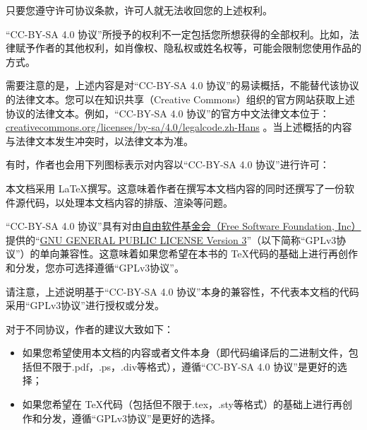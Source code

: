 只要您遵守许可协议条款，许可人就无法收回您的上述权利。

“CC-BY-SA 4.0 协议”所授予的权利不一定包括您所想获得的全部权利。比如，法律赋予作者的其他权利，如肖像权、隐私权或姓名权等，可能会限制您使用作品的方式。

需要注意的是，上述内容是对“CC-BY-SA 4.0 协议”的易读概括，不能替代该协议的法律文本。您可以在知识共享（Creative Commons）组织的官方网站获取上述协议的法律文本。例如，“CC-BY-SA 4.0 协议”的官方中文法律文本位于：\href{https://creativecommons.org/licenses/by-sa/4.0/legalcode.zh-Hans}{creativecommons.org/licenses/by-sa/4.0/legalcode.zh-Hans} 。当上述概括的内容与法律文本发生冲突时，以法律文本为准。

有时，作者也会用下列图标表示对内容以“CC-BY-SA 4.0 协议”进行许可：


本文档采用 \LaTeX 撰写。这意味着作者在撰写本文档内容的同时还撰写了一份软件源代码，以处理本文档内容的排版、渲染等问题。

“CC-BY-SA 4.0 协议”具有对由\href{https://www.fsf.org/}{自由软件基金会（Free Software Foundation, Inc）}提供的“\href{https://www.gnu.org/licenses/gpl-3.0.html}{GNU GENERAL PUBLIC LICENSE Version 3}”（以下简称“GPLv3协议”）的单向兼容性。这意味着如果您希望在本书的 \TeX 代码的基础上进行再创作和分发，您亦可选择遵循“GPLv3协议”。 


请注意，上述说明基于“CC-BY-SA 4.0 协议”本身的兼容性，不代表本文档的代码采用“GPLv3协议”进行授权或分发。

对于不同协议，作者的建议大致如下：

\begin{itemize}
    \item 如果您希望使用本文档的内容或者文件本身（即代码编译后的二进制文件，包括但不限于.pdf，.ps，.div等格式），遵循“CC-BY-SA 4.0 协议”是更好的选择；
    
    \item 如果您希望在 \TeX 代码（包括但不限于.tex，.sty等格式）的基础上进行再创作和分发，遵循“GPLv3协议”是更好的选择。
\end{itemize}

